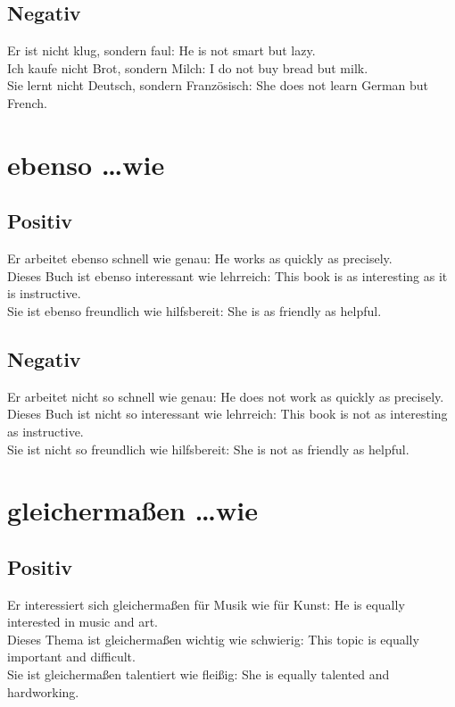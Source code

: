\documentclass[a4paper]{article}
\begin{document}
        \subsection{Negativ}
            Er ist nicht klug, sondern faul: He is not smart but lazy. \\
            Ich kaufe nicht Brot, sondern Milch: I do not buy bread but milk. \\
            Sie lernt nicht Deutsch, sondern Französisch: She does not learn German but French. \\
    
    
    \section{ebenso \dots wie}
        
        \subsection{Positiv}
            Er arbeitet ebenso schnell wie genau: He works as quickly as precisely. \\
            Dieses Buch ist ebenso interessant wie lehrreich: This book is as interesting as it is instructive. \\
            Sie ist ebenso freundlich wie hilfsbereit: She is as friendly as helpful. \\
        
        \subsection{Negativ}
            Er arbeitet nicht so schnell wie genau: He does not work as quickly as precisely. \\
            Dieses Buch ist nicht so interessant wie lehrreich: This book is not as interesting as instructive. \\
            Sie ist nicht so freundlich wie hilfsbereit: She is not as friendly as helpful. \\
    
    
    \section{gleichermaßen \dots wie}
        
        \subsection{Positiv}
            Er interessiert sich gleichermaßen für Musik wie für Kunst: He is equally interested in music and art. \\
            Dieses Thema ist gleichermaßen wichtig wie schwierig: This topic is equally important and difficult. \\
            Sie ist gleichermaßen talentiert wie fleißig: She is equally talented and hardworking. \\
        
\end{document}
